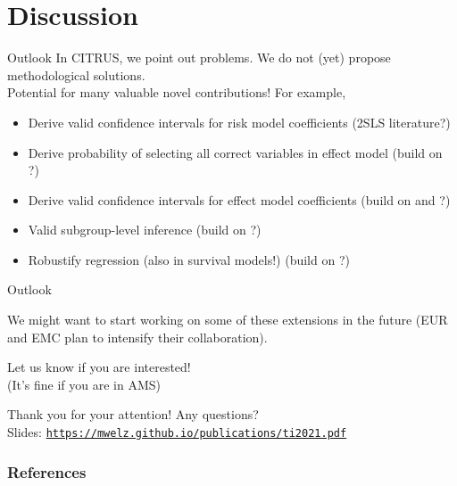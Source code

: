 \documentclass[11pt]{beamer}
\begin{document}
\section{Discussion}

\begin{frame}{Outlook}
In CITRUS, we point out problems. We do not (yet) propose methodological solutions.\\ 
\textcolor{emc-darkblue}{} \alert{Potential for many valuable novel contributions!} For example,

\begin{itemize}\setlength\itemsep{1em}
	\item Derive valid confidence intervals for risk model coefficients (2SLS literature?)
	\item Derive probability of selecting all correct variables in effect model (build on \cite{bien2013}?)
	\item Derive valid confidence intervals for effect model coefficients (build on \cite{dezeure2015} and \cite{vandegeer2016estimation}?)
	\item Valid subgroup-level inference (build on \cite{guo2021}?)
	\item Robustify regression (also in survival models!) (build on \cite{lecue2020}?)
\end{itemize}
\end{frame}

\begin{frame}{Outlook}

\begin{center}
We might want to start working on some of these extensions in the future (EUR and EMC plan to intensify their collaboration). \bigskip
\end{center}

\begin{center}
\huge{\alert{Let us know if you are interested!} \\(It's fine if you are in AMS)}
\end{center}
\end{frame}

\begin{frame}
\centering \Huge{Thank you for your attention! Any questions?}\\
{\large
Slides: \href{https://mwelz.github.io/publications/ti2021.pdf}{\textcolor{emc-darkblue}{\texttt{https://mwelz.github.io/publications/ti2021.pdf}}}}
\end{frame}



\begin{frame}[t,allowframebreaks]
\frametitle{References}

\end{frame}
\end{document}
